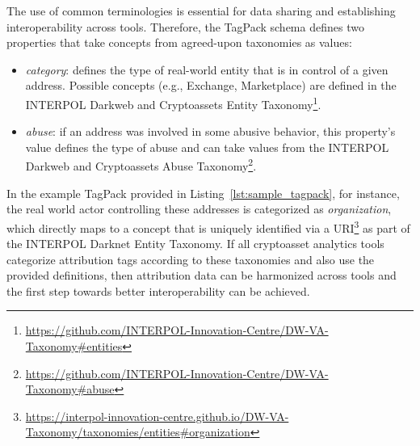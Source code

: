 The use of common terminologies is essential for data sharing and establishing interoperability across tools. Therefore, the TagPack schema defines two properties that take concepts from agreed-upon taxonomies as values:

\begin{itemize}

	\item \emph{category}: defines the type of real-world entity that is in control of a given address. Possible concepts (e.g., Exchange, Marketplace) are defined in the INTERPOL Darkweb and Cryptoassets Entity Taxonomy\footnote{\url{https://github.com/INTERPOL-Innovation-Centre/DW-VA-Taxonomy\#entities}}.

	\item \emph{abuse}: if an address was involved in some abusive behavior, this property's value defines the type of abuse and can take values from the INTERPOL Darkweb and Cryptoassets Abuse Taxonomy\footnote{\url{https://github.com/INTERPOL-Innovation-Centre/DW-VA-Taxonomy\#abuse}}.

\end{itemize}

In the example TagPack provided in Listing~\ref{lst:sample_tagpack}, for instance, the real world actor controlling these addresses is categorized as \emph{organization}, which directly maps to a concept that is uniquely identified via a URI\footnote{\url{https://interpol-innovation-centre.github.io/DW-VA-Taxonomy/taxonomies/entities\#organization}} as part of the INTERPOL Darknet Entity Taxonomy. If all cryptoasset analytics tools categorize attribution tags according to these taxonomies and also use the provided definitions, then attribution data can be harmonized across tools and the first step towards better interoperability can be achieved.
